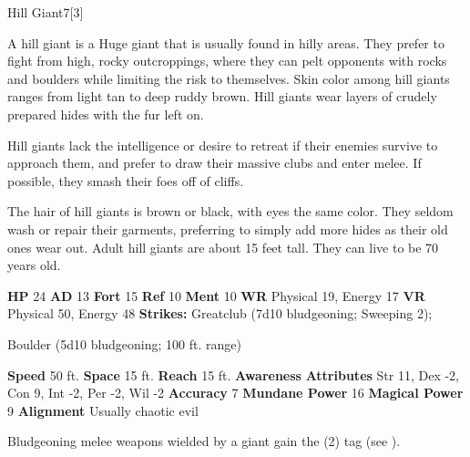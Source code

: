       
  \begin{monsubsection}{Hill Giant}{7}[3]
    \vspace{-1em}\vspace{-1em}
    \vspace{0em}

    
          A hill giant is a Huge giant that is usually found in hilly areas.
          They prefer to fight from high, rocky outcroppings, where they can pelt opponents with rocks and boulders while limiting the risk to themselves.
          Skin color among hill giants ranges from light tan to deep ruddy brown.
          Hill giants wear layers of crudely prepared hides with the fur left on.
        
          Hill giants lack the intelligence or desire to retreat if their enemies survive to approach them, and prefer to draw their massive clubs and enter melee.
          If possible, they smash their foes off of cliffs.

          The hair of hill giants is brown or black, with eyes the same color.
          They seldom wash or repair their garments, preferring to simply add more hides as their old ones wear out.
          Adult hill giants are about 15 feet tall.
          They can live to be 70 years old.
        

    \begin{spellcontent}
      \begin{spelltargetinginfo}
        \pari \textbf{HP} 24 \monsep
          \textbf{AD} 13 \monsep
          \textbf{Fort} 15 \monsep
          \textbf{Ref} 10 \monsep
          \textbf{Ment} 10
        \pari \textbf{WR} Physical 19, Energy 17 \monsep
        \textbf{VR} Physical 50, Energy 48
        \pari \textbf{Strikes:}
            Greatclub  (7d10 bludgeoning; Sweeping 2);
\par Boulder  (5d10 bludgeoning; 100 ft. range)
      \end{spelltargetinginfo}
    \end{spellcontent}
    \begin{monsterfooter}
      \pari \textbf{Speed} 50 ft. \monsep
        \textbf{Space} 15 ft. \monsep
        \textbf{Reach} 15 ft.
      \pari \textbf{Awareness} 
      \pari \textbf{Attributes}
        Str 11, Dex -2,
        Con 9, Int -2,
        Per -2, Wil -2
      \pari \textbf{Accuracy} 7 \monsep
        \textbf{Mundane Power} 16 \monsep
      \textbf{Magical Power} 9
      \pari \textbf{Alignment} Usually chaotic evil
    \end{monsterfooter}
  \end{monsubsection}
        Bludgeoning melee weapons wielded by a giant gain the  (2) tag (see ).
      
